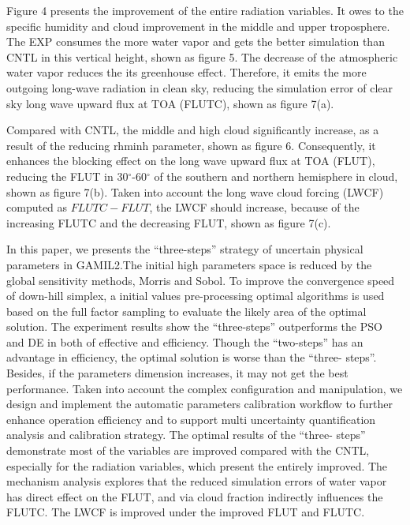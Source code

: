 \documentclass[gmd, manuscript]{copernicus}
\begin{document}
Figure 4 presents the improvement of the entire radiation variables. It owes to the specific
humidity and cloud improvement in the middle and upper troposphere. The EXP consumes the more
water vapor and gets the better simulation than CNTL in this vertical height, shown as figure
5. The decrease of the atmospheric water vapor reduces the its greenhouse effect. Therefore, it
emits the more outgoing long-wave radiation in clean sky, reducing the simulation error of clear
sky long wave upward flux at TOA (FLUTC), shown as figure 7(a).

Compared with CNTL, the middle and high cloud significantly increase, as a result of the reducing
rhminh parameter, shown as figure 6. Consequently, it enhances the blocking effect on the long wave
upward flux at TOA (FLUT), reducing the FLUT in 30$^\circ$-60$^\circ$ of the southern and northern
hemisphere in cloud, shown as figure 7(b). Taken into account the long wave cloud forcing (LWCF)
computed as $FLUTC - FLUT$, the LWCF should increase, because of the increasing FLUTC and  the
decreasing FLUT, shown as figure 7(c).


\conclusions  %

In this paper, we presents the ``three-steps'' strategy of uncertain physical parameters in
GAMIL2.The initial high parameters space is reduced by the global sensitivity methods, Morris and
Sobol. To improve the convergence speed of down-hill simplex, a initial values pre-processing
optimal algorithms is used based on the full factor sampling to evaluate the likely area of the
optimal solution. The experiment results show the ``three-steps'' outperforms the PSO and DE in
both of effective and efficiency. Though the ``two-steps'' has an advantage in efficiency, the
optimal solution is worse than the ``three- steps''. Besides, if the parameters dimension
increases, it may not get the best performance. Taken into account the complex configuration and
manipulation, we design and implement the automatic parameters calibration workflow to further
enhance operation efficiency and to support multi uncertainty quantification analysis and
calibration strategy. The optimal results of the ``three- steps'' demonstrate most of the variables
are improved compared with the CNTL, especially for the radiation variables, which present the
entirely improved. The mechanism analysis explores that the reduced simulation errors of water 
vapor has direct effect on the FLUT, and via cloud fraction indirectly influences the FLUTC. The 
LWCF is improved under the improved FLUT and FLUTC.
\end{document}
